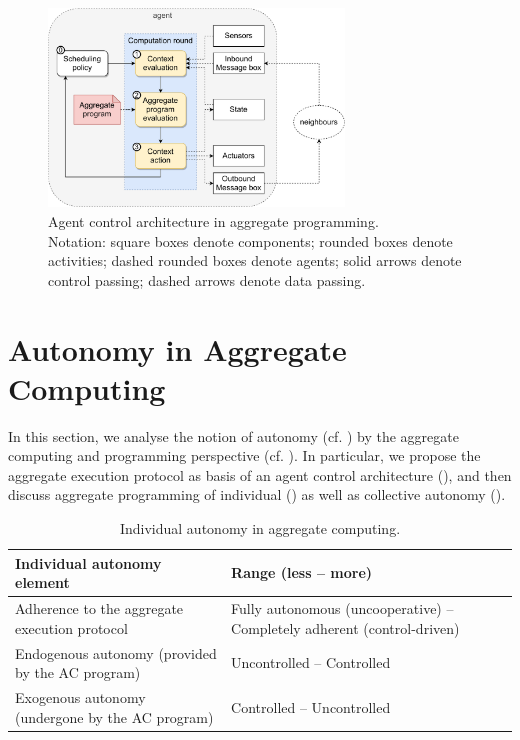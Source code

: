 \begin{figure}
\centering
\includegraphics[width=0.7\textwidth]{papers/mdpi2020/imgs/aggregate-agent-control-architecture.pdf}
\caption[Agent control architecture in aggregate programming.]{Agent control architecture in aggregate programming.\\ 
Notation: square boxes denote components; rounded boxes denote activities; dashed rounded boxes denote agents; solid arrows denote control passing; dashed arrows denote data passing.}
\label{fig:aggregate-control-arch}
\end{figure}

\section{Autonomy in Aggregate Computing}
\label{s:autonomy-ac}

In this section,
 we analyse the notion of autonomy (cf. )
 by the aggregate computing and programming perspective (cf. ).
%
In particular, we 
 propose the aggregate execution protocol 
  as basis of an agent control architecture (), and then
 discuss aggregate programming of individual ()
 as well as collective autonomy ().
 

\begin{table}
\centering
\begin{tabularx}{1\textwidth}{|p{}|p{}|} %
\hline
\textbf{Individual autonomy element} & \textbf{Range (less -- more)}
\\\hline
Adherence to the aggregate execution protocol & Fully autonomous (uncooperative) -- Completely adherent (control-driven)
\\\hline
Endogenous autonomy (provided by the AC program) & Uncontrolled -- Controlled
\\\hline
Exogenous autonomy (undergone by the AC program) & Controlled -- Uncontrolled
\\\hline
\end{tabularx} 
\caption{Individual autonomy in aggregate computing.}
\label{table:summary-ac-individual-autonomy}
\end{table}

